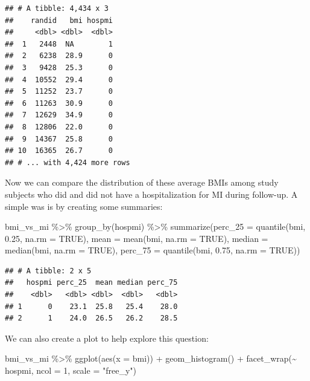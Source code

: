 \documentclass[
]{book}
\newenvironment{Shaded}{\begin{snugshade}}{\end{snugshade}}
\newcommand{\AttributeTok}[1]{\textcolor[rgb]{0.77,0.63,0.00}{#1}}
\newcommand{\ConstantTok}[1]{\textcolor[rgb]{0.00,0.00,0.00}{#1}}
\newcommand{\DecValTok}[1]{\textcolor[rgb]{0.00,0.00,0.81}{#1}}
\newcommand{\FloatTok}[1]{\textcolor[rgb]{0.00,0.00,0.81}{#1}}
\newcommand{\FunctionTok}[1]{\textcolor[rgb]{0.00,0.00,0.00}{#1}}
\newcommand{\NormalTok}[1]{#1}
\newcommand{\SpecialCharTok}[1]{\textcolor[rgb]{0.00,0.00,0.00}{#1}}
\newcommand{\StringTok}[1]{\textcolor[rgb]{0.31,0.60,0.02}{#1}}
\begin{document}
\begin{verbatim}
## # A tibble: 4,434 x 3
##    randid   bmi hospmi
##     <dbl> <dbl>  <dbl>
##  1   2448  NA        1
##  2   6238  28.9      0
##  3   9428  25.3      0
##  4  10552  29.4      0
##  5  11252  23.7      0
##  6  11263  30.9      0
##  7  12629  34.9      0
##  8  12806  22.0      0
##  9  14367  25.8      0
## 10  16365  26.7      0
## # ... with 4,424 more rows
\end{verbatim}

Now we can compare the distribution of these average BMIs among study subjects who did and did not have a hospitalization for MI during follow-up. A simple was is by creating some summaries:

\begin{Shaded}
\begin{Highlighting}[]
\NormalTok{bmi\_vs\_mi }\SpecialCharTok{\%\textgreater{}\%} 
  \FunctionTok{group\_by}\NormalTok{(hospmi) }\SpecialCharTok{\%\textgreater{}\%} 
  \FunctionTok{summarize}\NormalTok{(}\AttributeTok{perc\_25 =} \FunctionTok{quantile}\NormalTok{(bmi, }\FloatTok{0.25}\NormalTok{, }\AttributeTok{na.rm =} \ConstantTok{TRUE}\NormalTok{), }
            \AttributeTok{mean =} \FunctionTok{mean}\NormalTok{(bmi, }\AttributeTok{na.rm =} \ConstantTok{TRUE}\NormalTok{), }
            \AttributeTok{median =} \FunctionTok{median}\NormalTok{(bmi, }\AttributeTok{na.rm =} \ConstantTok{TRUE}\NormalTok{),}
            \AttributeTok{perc\_75 =} \FunctionTok{quantile}\NormalTok{(bmi, }\FloatTok{0.75}\NormalTok{, }\AttributeTok{na.rm =} \ConstantTok{TRUE}\NormalTok{))}
\end{Highlighting}
\end{Shaded}

\begin{verbatim}
## # A tibble: 2 x 5
##   hospmi perc_25  mean median perc_75
##    <dbl>   <dbl> <dbl>  <dbl>   <dbl>
## 1      0    23.1  25.8   25.4    28.0
## 2      1    24.0  26.5   26.2    28.5
\end{verbatim}

We can also create a plot to help explore this question:

\begin{Shaded}
\begin{Highlighting}[]
\NormalTok{bmi\_vs\_mi }\SpecialCharTok{\%\textgreater{}\%} 
  \FunctionTok{ggplot}\NormalTok{(}\FunctionTok{aes}\NormalTok{(}\AttributeTok{x =}\NormalTok{ bmi)) }\SpecialCharTok{+} 
  \FunctionTok{geom\_histogram}\NormalTok{() }\SpecialCharTok{+} 
  \FunctionTok{facet\_wrap}\NormalTok{(}\SpecialCharTok{\textasciitilde{}}\NormalTok{ hospmi, }\AttributeTok{ncol =} \DecValTok{1}\NormalTok{, }\AttributeTok{scale =} \StringTok{"free\_y"}\NormalTok{)}
\end{Highlighting}
\end{Shaded}
\end{document}
